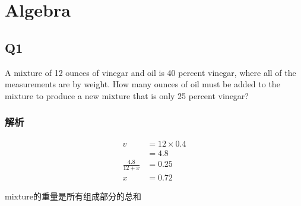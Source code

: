 \chapter{Algebra}

\section{Q1}

  A mixture of 12 ounces of vinegar and oil is 40 percent vinegar, where all
  of the measurements are by weight. How many ounces of oil must be added to
  the mixture to produce a new mixture that is only 25 percent vinegar?

  \subsection{解析}

    \begin{align*}
      v &= 12 \times 0.4 \\
      &= 4.8 \\
      \frac{4.8}{12 + x} &= 0.25 \\
      x &= 0.72
    \end{align*}

    mixture的重量是所有组成部分的总和
